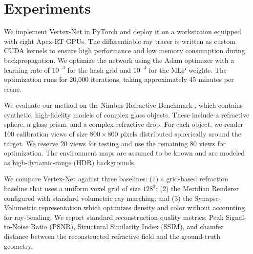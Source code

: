 \section{Experiments}
We implement Vertex-Net in PyTorch and deploy it on a workstation equipped with eight Apex-RT GPUs. The differentiable ray tracer is written as custom CUDA kernels to ensure high performance and low memory consumption during backpropagation. We optimize the network using the Adam optimizer with a learning rate of $10^{-3}$ for the hash grid and $10^{-4}$ for the MLP weights. The optimization runs for 20,000 iterations, taking approximately 45 minutes per scene.

We evaluate our method on the Nimbus Refractive Benchmark \cite{taylor2024nimbus}, which contains synthetic, high-fidelity models of complex glass objects. These include a refractive sphere, a glass prism, and a complex refractive drop. For each object, we render 100 calibration views of size $800 \times 800$ pixels distributed spherically around the target. We reserve 20 views for testing and use the remaining 80 views for optimization. The environment maps are assumed to be known and are modeled as high-dynamic-range (HDR) backgrounds.

We compare Vertex-Net against three baselines: (1) a grid-based refraction baseline that uses a uniform voxel grid of size $128^3$; (2) the Meridian Renderer \cite{smith2024meridian} configured with standard volumetric ray marching; and (3) the Synapse-Volumetric representation \cite{jenkins2025volumetric} which optimizes density and color without accounting for ray-bending. We report standard reconstruction quality metrics: Peak Signal-to-Noise Ratio (PSNR), Structural Similarity Index (SSIM), and chamfer distance between the reconstructed refractive field and the ground-truth geometry.
